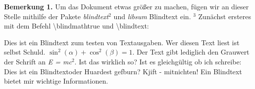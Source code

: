 \documentclass{scrartcl}
\begin{document}
\textbf{Bemerkung 1.} Um das Dokument etwas größer zu machen, f\"ugen wir an dieser Stelle mithilfe
der Pakete \textit{blindtext}$^{\hyperref[blindtext]{2}}$ und \textit{libsum} Blindtext ein.
$^{\hyperref[blind]{3}}$ Zun\"achst ersteres mit dem Befehl \textbackslash{}blindmathtrue und
\textbackslash{}blindtext:\newline

\blindtext %
\par Dies ist ein Blindtext zum testen von Textausgaben. Wer diesen Text liest ist selbst Schuld.
$\sin^{2}{(\alpha)} + \cos^{2}{(\beta)} = 1$. Der Text gibt lediglich den Grauwert der Schrift an
\textit{E = mc}$^{2}$. %
Ist das wirklich so? Ist es gleichg\"ultig ob ich schreibe: \glqq Dies ist ein Blindtext\grqq oder \glqq Huardest gefburn\grqq ? Kjift - mitnichten! Ein Blindtext bietet mir wichtige Informationen.
\Blindtext %
\end{document}
